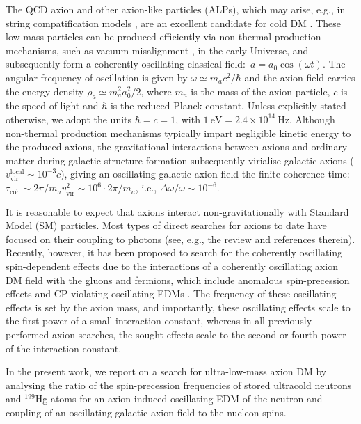 The QCD axion and other axion-like particles (ALPs), which may arise, e.g., in string compatification models \cite{Witten1984,Conlon2006,Witten2006,Arvanitaki2010,Arias2012,Marsh2015Review}, are an excellent candidate for cold DM \cite{footnote1}.
These low-mass particles can be produced efficiently via non-thermal production mechanisms, such as vacuum misalignment \cite{Preskill1983cosmo,Sikivie1983cosmo,Dine1983cosmo}, in the early Universe, and subsequently form a coherently oscillating classical field:~$a = a_0 \cos(\omega t)$.
The angular frequency of oscillation is given by $\omega \simeq m_a c^2 / \hbar$ and the axion field carries the energy density $\rho_a \simeq m_a^2 a_0^2 /2$, where $m_a$ is the mass of the axion particle, $c$ is the speed of light and $\hbar$ is the reduced Planck constant.
Unless explicitly stated otherwise, we adopt the units $\hbar = c = 1$, with $1~\textrm{eV} = 2.4 \times 10^{14}~\textrm{Hz}$.
Although non-thermal production mechanisms typically impart negligible kinetic energy to the produced axions, the gravitational interactions between axions and ordinary matter during galactic structure formation subsequently virialise galactic axions ($v_{\textrm{vir}}^{\textrm{local}} \sim 10^{-3}c$), giving an oscillating galactic axion field the finite coherence time:~$\tau_{\textrm{coh}} \sim 2\pi / m_a v_{\textrm{vir}}^2 \sim 10^6 \cdot  2\pi / m_a $, i.e., $\Delta \omega/ \omega \sim 10^{-6}$.


It is reasonable to expect that axions interact non-gravitationally with Standard Model (SM) particles. Most types of direct searches for axions to date have focused on their coupling to photons (see, e.g., the review \cite{Axion-Review2015} and references therein). Recently, however, it has been proposed to search for the coherently oscillating spin-dependent effects due to the interactions of a coherently oscillating axion DM field with the gluons and fermions, which include anomalous spin-precession effects and CP-violating oscillating EDMs \cite{Graham2011,Flambaum2013Patras,Graham2013,Stadnik2014A,CASPEr2014,Roberts2014A}. The frequency of these oscillating effects is set by the axion mass, and importantly, these oscillating effects scale to the first power of a small interaction constant, whereas in all previously-performed axion searches, the sought effects scale to the second or fourth power of the interaction constant.


In the present work, we report on a search for ultra-low-mass axion DM by analysing the ratio of the spin-precession frequencies of stored ultracold neutrons and $^{199}$Hg atoms for an axion-induced oscillating EDM of the neutron and coupling of an oscillating galactic axion field to the nucleon spins.

